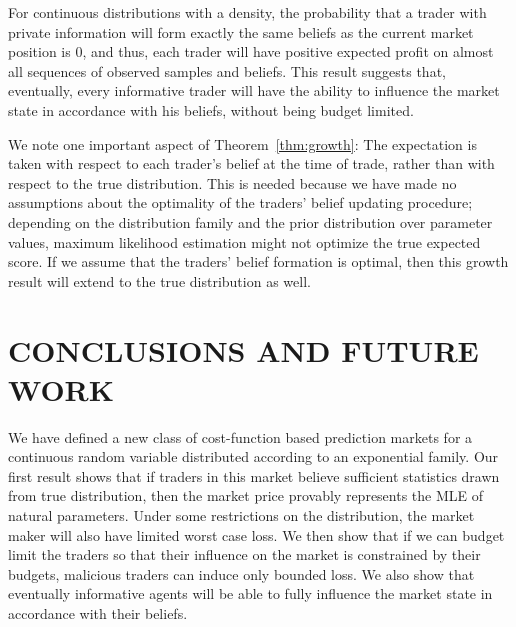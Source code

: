\documentclass{article}
\begin{document}
For continuous distributions with a density, the probability that a trader with private information will form exactly the same beliefs as the current market position is $0$, and thus, each trader will have positive expected profit on almost all sequences of observed samples and beliefs. 
This result suggests that, eventually, every informative trader will have the ability to influence the market state in accordance with his beliefs, without being budget limited.

We note one important aspect of Theorem~\ref{thm:growth}: The expectation is taken with respect to each trader's belief at the time of trade, rather than with respect to the true distribution. This is needed because we have made no assumptions about the optimality of the traders' belief updating procedure; depending on the distribution family and the prior distribution over parameter values, maximum likelihood estimation might not optimize the true expected score. If we assume that the traders' belief formation is optimal, then this growth result will extend to the true distribution as well.

\section{CONCLUSIONS AND FUTURE WORK}\label{sec:conclusion}
We have defined a new class of cost-function based prediction markets for a continuous random variable distributed according to an exponential family. Our first result shows that if traders in this market believe sufficient statistics drawn from true distribution, then the market price provably represents the MLE of natural parameters. Under some restrictions on the distribution, the market maker will also have limited worst case loss. We then show that if we can budget limit the traders so that their influence on the market is constrained by their budgets, malicious traders can induce only bounded loss. We also show that eventually informative agents will be able to fully influence the market state in accordance with their beliefs. 
\end{document}
